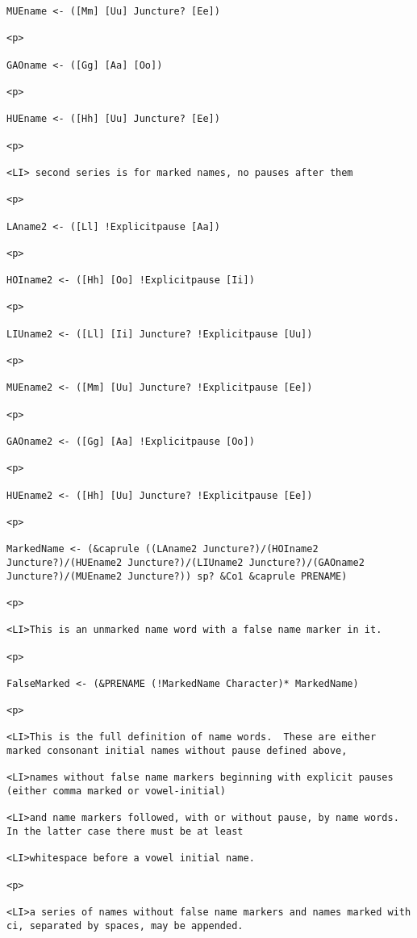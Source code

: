 \documentclass[12pt]{article}
\begin{document}
\begin{lstlisting}
MUEname <- ([Mm] [Uu] Juncture? [Ee])

<p>

GAOname <- ([Gg] [Aa] [Oo])

<p>

HUEname <- ([Hh] [Uu] Juncture? [Ee])

<p>

<LI> second series is for marked names, no pauses after them

<p>

LAname2 <- ([Ll] !Explicitpause [Aa])

<p>

HOIname2 <- ([Hh] [Oo] !Explicitpause [Ii])

<p>

LIUname2 <- ([Ll] [Ii] Juncture? !Explicitpause [Uu])

<p>

MUEname2 <- ([Mm] [Uu] Juncture? !Explicitpause [Ee])

<p>

GAOname2 <- ([Gg] [Aa] !Explicitpause [Oo])

<p>

HUEname2 <- ([Hh] [Uu] Juncture? !Explicitpause [Ee])

<p>

MarkedName <- (&caprule ((LAname2 Juncture?)/(HOIname2 Juncture?)/(HUEname2 Juncture?)/(LIUname2 Juncture?)/(GAOname2 Juncture?)/(MUEname2 Juncture?)) sp? &Co1 &caprule PRENAME)

<p>

<LI>This is an unmarked name word with a false name marker in it.

<p>

FalseMarked <- (&PRENAME (!MarkedName Character)* MarkedName)

<p>

<LI>This is the full definition of name words.  These are either marked consonant initial names without pause defined above,

<LI>names without false name markers beginning with explicit pauses (either comma marked or vowel-initial)

<LI>and name markers followed, with or without pause, by name words.  In the latter case there must be at least

<LI>whitespace before a vowel initial name.

<p>

<LI>a series of names without false name markers and names marked with ci, separated by spaces, may be appended.


\end{lstlisting}
\end{document}
